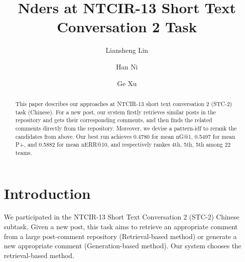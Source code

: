 \documentclass{llncs}
\begin{document}
%
%


%
%
\title{Nders at NTCIR-13 Short Text Conversation 2 Task}
%
\titlerunning{}  %
%
\author{Liansheng Lin \and Han Ni \and Ge Xu}
%
%
%

\maketitle              %

\begin{abstract}
This paper describes our approaches at NTCIR-13 short text conversation 2 
(STC-2) task (Chinese). For a new post, our system firstly retrieves similar posts 
in the repository and gets their corresponding comments, and then finds the 
related comments directly from the repository. Moreover, we devise a pattern-idf 
to rerank the candidates from above. Our best run achieves 0.4780 for mean nG@1, 
0.5497 for mean P+, and 0.5882 for mean nERR@10, and respectively rankes 4th, 
5th, 5th among 22 teams. 
\end{abstract}

\section{Introduction}
We participated in the NTCIR-13 Short Text Conversation 2 (STC-2) Chinese 
subtask. Given a new post, this task aims to retrieve an appropriate comment 
from a large post-comment repository (Retrieval-based method) or generate a new 
appropriate comment (Generation-based method). Our system chooses the 
retrieval-based method. 
\end{document}
